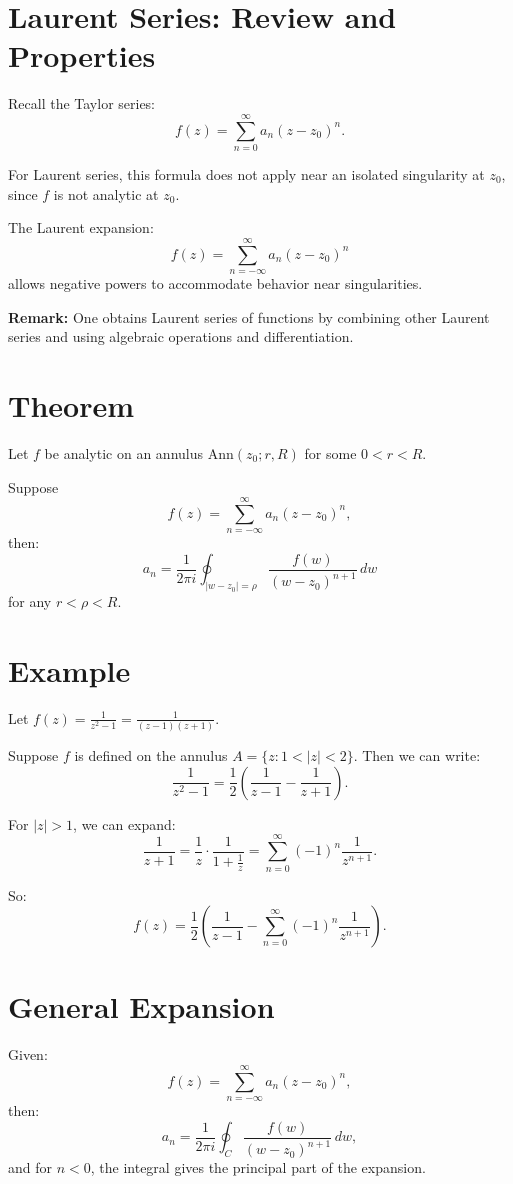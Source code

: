 \documentclass[12pt]{article}
\theoremstyle{definition} %
\theoremstyle{plain} %
\begin{document}
\section*{Laurent Series: Review and Properties}

Recall the Taylor series:
\[
f(z) = \sum_{n=0}^\infty a_n (z - z_0)^n.
\]

For Laurent series, this formula does not apply near an isolated singularity at $z_0$, since $f$ is not analytic at $z_0$.

The Laurent expansion:
\[
f(z) = \sum_{n=-\infty}^\infty a_n (z - z_0)^n
\]
allows negative powers to accommodate behavior near singularities.

\textbf{Remark:} One obtains Laurent series of functions by combining other Laurent series and using algebraic operations and differentiation.

\section*{Theorem}

Let $f$ be analytic on an annulus $\text{Ann}(z_0; r, R)$ for some $0 < r < R$.

Suppose
\[
f(z) = \sum_{n=-\infty}^{\infty} a_n (z - z_0)^n,
\]
then:
\[
a_n = \frac{1}{2\pi i} \oint_{|w - z_0| = \rho} \frac{f(w)}{(w - z_0)^{n+1}}\, dw
\]
for any $r < \rho < R$.

\section*{Example}

Let $f(z) = \frac{1}{z^2 - 1} = \frac{1}{(z - 1)(z + 1)}$.

Suppose $f$ is defined on the annulus $A = \{ z : 1 < |z| < 2 \}$. Then we can write:
\[
\frac{1}{z^2 - 1} = \frac{1}{2} \left( \frac{1}{z - 1} - \frac{1}{z + 1} \right).
\]

For $|z| > 1$, we can expand:
\[
\frac{1}{z + 1} = \frac{1}{z} \cdot \frac{1}{1 + \frac{1}{z}} = \sum_{n=0}^\infty (-1)^n \frac{1}{z^{n+1}}.
\]

So:
\[
f(z) = \frac{1}{2} \left( \frac{1}{z - 1} - \sum_{n=0}^\infty (-1)^n \frac{1}{z^{n+1}} \right).
\]

\section*{General Expansion}

Given:
\[
f(z) = \sum_{n=-\infty}^\infty a_n (z - z_0)^n,
\]
then:
\[
a_n = \frac{1}{2\pi i} \oint_{C} \frac{f(w)}{(w - z_0)^{n+1}}\, dw,
\]
and for $n < 0$, the integral gives the principal part of the expansion.
\end{document}
